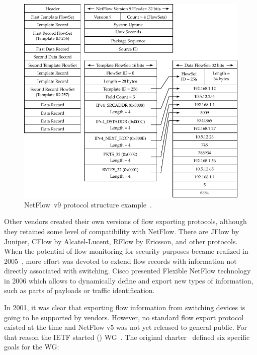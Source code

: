 \begin{figure}[t!]
  \begin{center}
    \includegraphics[width=\textwidth]{figures/nf9-protocol}
  \end{center}
  \caption{NetFlow~v9 protocol structure example~\cite{CiscoSystems-2007-NetFlow}.}
  \label{fig:nf9-protocol}
\end{figure}

Other vendors created their own versions of flow exporting protocols, although they retained some level of compatibility with NetFlow. There are JFlow by Juniper, CFlow by Alcatel-Lucent, RFlow by Ericsson, and other protocols. When the potential of flow monitoring for security purposes became realized in 2005~\cite{CiscoSystems-2005-Cisco}, more effort was devoted to extend flow records with information not directly associated with switching. Cisco presented Flexible NetFlow technology~\cite{CiscoSystems-2008-Cisco} in 2006 which allows to dynamically define and export new types of information, such as parts of payloads or traffic identification.

In 2001, it was clear that exporting flow information from switching devices is going to be supported by vendors. However, no standard flow export protocol existed at the time and NetFlow v5 was not yet released to general public. For that reason the IETF started  () WG~\cite{IETF--IP}. The original charter~\cite{IESG-2001-IP} defined six specific goals for the WG: 

